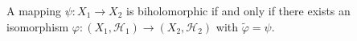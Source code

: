 A mapping $\psi: X_1 \rightarrow X_2$ is biholomorphic if and only if there exists an isomorphism $\varphi: (X_1, \mathcal{H}_1) \rightarrow (X_2, \mathcal{H}_2)$ with $\tilde{\varphi} = \psi$.
